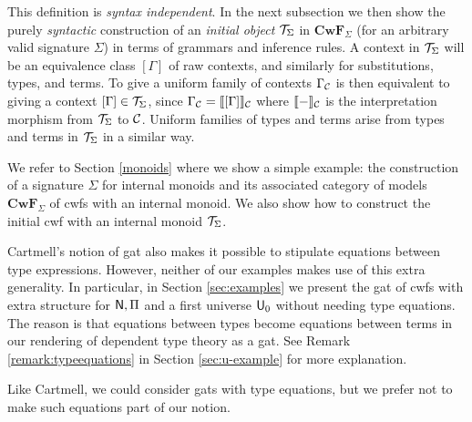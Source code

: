 \documentclass{lmcs}
\def\Cwf{\mathbf{CwF}}
\begin{document}
This definition is {\em syntax independent}. In the next subsection we then show the purely {\em syntactic} construction of an {\em initial object} ${\mathcal T}_{\Sigma}$ in $\Cwf_{\Sigma}$ (for an arbitrary valid signature $\Sigma$) in terms of grammars and inference rules. A context in ${\mathcal T}_{\Sigma}$ will be an equivalence class $[ \Gamma ]$ of raw contexts, and similarly for substitutions, types, and terms. To give a uniform
  family of contexts $\Gamma_{\mathcal C}$ is then equivalent to giving a context $[ \Gamma ] \in {\mathcal T}_{\Sigma}$, since $\Gamma_{\mathcal C} = \llbracket  [ \Gamma ]  \rrbracket_{\mathcal C}$ where $\llbracket - \rrbracket_{\mathcal C}$ is the interpretation morphism from ${\mathcal T}_\Sigma$ to ${\mathcal C}$.
Uniform families of types and terms arise from types and terms in ${\mathcal T}_\Sigma$ in a similar way.

We refer to Section \ref{monoids} where we show a simple example: the construction of a signature $\Sigma$ for internal monoids and its associated category of models $\Cwf_\Sigma$ of cwfs with an internal monoid. We also show how to construct the initial cwf with an internal monoid ${\mathcal T}_\Sigma$. 

\begin{remark}
Cartmell's notion of gat \cite{cartmell:phd,cartmell:apal} also makes it possible to stipulate equations between type expressions. However, neither of our examples makes use of this extra generality. In particular,  in Section \ref{sec:examples} we present the gat of cwfs with extra structure for $\mathsf{N}, \Pi$ and a first universe $\mathsf{U}_0$ without needing type equations. The reason is that
equations between types become equations between terms in our rendering
of dependent type theory as a gat. See Remark \ref{remark:typeequations} in Section \ref{sec:u-example} for more explanation.

Like Cartmell, we could consider gats with type equations, but we prefer not to make such equations part of our notion.


\end{remark}
\end{document}
